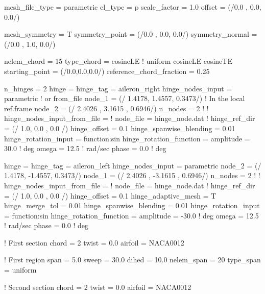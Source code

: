 \begin{inputfile}[frame=single, caption={Parametric geometry for flapped wing}, 
  label={file:parametric_example_flapped_wing.in}]
mesh_file_type = parametric
el_type = p
scale_factor = 1.0
offset = (/0.0 , 0.0,  0.0/)

mesh_symmetry = T
symmetry_point   = (/0.0 , 0.0,  0.0/)
symmetry_normal = (/0.0 , 1.0,  0.0/)

nelem_chord = 15
type_chord = cosineLE   ! uniform  cosineLE  cosineTE
starting_point = (/0.0,0.0,0.0/)
reference_chord_fraction = 0.25

n_hinges = 2
hinge = {
  hinge_tag = aileron_right
  hinge_nodes_input = parametric      ! or from_file
  node_1 = (/ 1.4178, 1.4557, 0.3473/)  ! In the local ref.frame
  node_2 = (/ 2.4026  , 3.1615  , 0.6946/)
  n_nodes = 2
  ! }
  ! hinge_nodes_input_from_file = {
  !   node_file = hinge_node.dat
  ! }
  hinge_ref_dir = (/ 1.0, 0.0 , 0.0 /)
  hinge_offset  = 0.1
  hinge_spanwise_blending = 0.01
  hinge_rotation_input = function:sin
  hinge_rotation_function = {
    amplitude = 30.0    ! deg
    omega     =  12.5   ! rad/sec
    phase     =  0.0    ! deg
  }

hinge = {
  hinge_tag = aileron_left
  hinge_nodes_input = parametric      
  node_2 = (/ 1.4178, -1.4557, 0.3473/)  
  node_1 = (/ 2.4026  , -3.1615  , 0.6946/)
  n_nodes = 2
  ! }
  ! hinge_nodes_input_from_file = {
  !   node_file = hinge_node.dat
  ! }
  hinge_ref_dir = (/ 1.0, 0.0 , 0.0 /)
  hinge_offset  = 0.1
  hinge_adaptive_mesh = T
  hinge_merge_tol = 0.01
  hinge_spanwise_blending = 0.01
  hinge_rotation_input = function:sin
  hinge_rotation_function = {
    amplitude = -30.0    ! deg
    omega     =  12.5    ! rad/sec
    phase     =  0.0     ! deg
  }


! First section
chord = 2
twist = 0.0
airfoil = NACA0012

! First region
span = 5.0
sweep = 30.0
dihed = 10.0
nelem_span = 20
type_span = uniform

! Second section
chord = 2
twist = 0.0
airfoil = NACA0012
\end{inputfile}

